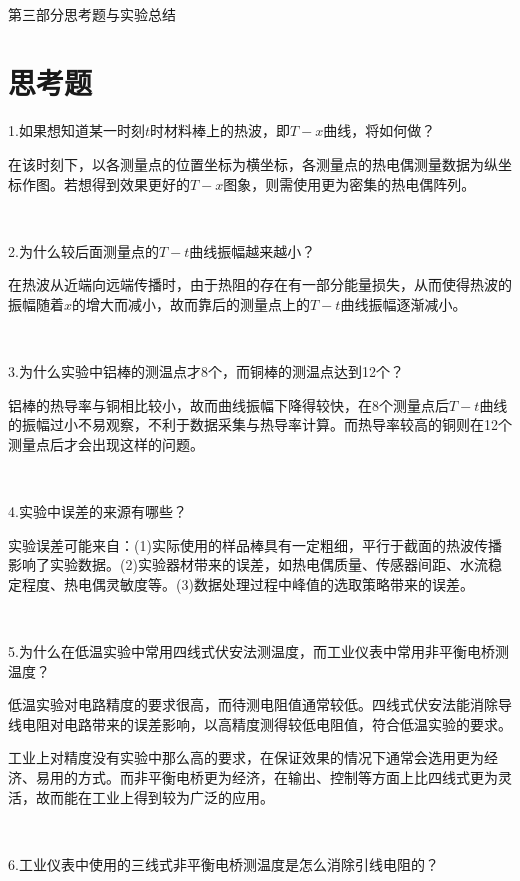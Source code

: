 \documentclass[UTF-8,twoside,cs4size]{ctexart}
\begin{document}
	\newpage
	
	~\
	
	\begin{center}
		\Large\heiti 第三部分\quad 思考题与实验总结
	\end{center}
	\setcounter{section}{0}
	
	\section{思考题}
	1.如果想知道某一时刻$ t $时材料棒上的热波，即$ T-x $曲线，将如何做？
	
	{\kaishu 在该时刻下，以各测量点的位置坐标为横坐标，各测量点的热电偶测量数据为纵坐标作图。若想得到效果更好的$ T-x $图象，则需使用更为密集的热电偶阵列。}
	
	~\
	
	2.为什么较后面测量点的$ T-t $曲线振幅越来越小？
	
	{\kaishu 在热波从近端向远端传播时，由于热阻的存在有一部分能量损失，从而使得热波的振幅随着$ x $的增大而减小，故而靠后的测量点上的$ T-t $曲线振幅逐渐减小。}
	
	~\
	
	3.为什么实验中铝棒的测温点才8个，而铜棒的测温点达到12个？
	
	{\kaishu 铝棒的热导率与铜相比较小，故而曲线振幅下降得较快，在8个测量点后$ T-t $曲线的振幅过小不易观察，不利于数据采集与热导率计算。而热导率较高的铜则在12个测量点后才会出现这样的问题。}
	
	~\
	
	4.实验中误差的来源有哪些？
	
	{\kaishu 实验误差可能来自：(1)实际使用的样品棒具有一定粗细，平行于截面的热波传播影响了实验数据。(2)实验器材带来的误差，如热电偶质量、传感器间距、水流稳定程度、热电偶灵敏度等。(3)数据处理过程中峰值的选取策略带来的误差。}
	
	~\
	
	5.为什么在低温实验中常用四线式伏安法测温度，而工业仪表中常用非平衡电桥测温度？
	
	{\kaishu 低温实验对电路精度的要求很高，而待测电阻值通常较低。四线式伏安法能消除导线电阻对电路带来的误差影响，以高精度测得较低电阻值，符合低温实验的要求。}
	
	{\kaishu 工业上对精度没有实验中那么高的要求，在保证效果的情况下通常会选用更为经济、易用的方式。而非平衡电桥更为经济，在输出、控制等方面上比四线式更为灵活，故而能在工业上得到较为广泛的应用。}
	
	~\
	
	6.工业仪表中使用的三线式非平衡电桥测温度是怎么消除引线电阻的？
	
\end{document}
